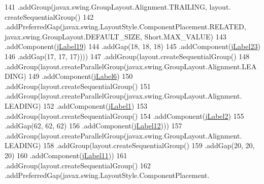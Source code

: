 \begin{DoxyCode}
141                                 .addGroup(javax.swing.GroupLayout.Alignment.TRAILING, layout.
      createSequentialGroup()
142                                     .addPreferredGap(javax.swing.LayoutStyle.ComponentPlacement.RELATED, 
      javax.swing.GroupLayout.DEFAULT\_SIZE, Short.MAX\_VALUE)
143                                     .addComponent(\mbox{\hyperlink{class_interfaz_package_1_1_interfaz_consulta_factura_a901a8d0df72dbe316e6945341e438f52}{jLabel19}})
144                                     .addGap(18, 18, 18)
145                                     .addComponent(\mbox{\hyperlink{class_interfaz_package_1_1_interfaz_consulta_factura_a1f75868545728f2ec9d78490ebcb8d39}{jLabel23}})
146                                     .addGap(17, 17, 17))))
147                         .addGroup(layout.createSequentialGroup()
148                             .addGroup(layout.createParallelGroup(javax.swing.GroupLayout.Alignment.LEADING)
149                                 .addComponent(\mbox{\hyperlink{class_interfaz_package_1_1_interfaz_consulta_factura_a0769a03c29fa86b156dbb861f170e3cf}{jLabel6}})
150                                 .addGroup(layout.createSequentialGroup()
151                                     .addGroup(layout.createParallelGroup(javax.swing.GroupLayout.Alignment.
      LEADING)
152                                         .addComponent(\mbox{\hyperlink{class_interfaz_package_1_1_interfaz_consulta_factura_aa4f98cc39ae51135b1d8e0e06f11af83}{jLabel1}})
153                                         .addGroup(layout.createSequentialGroup()
154                                             .addComponent(\mbox{\hyperlink{class_interfaz_package_1_1_interfaz_consulta_factura_a38f87d430d09d898be8970e195019a3a}{jLabel2}})
155                                             .addGap(62, 62, 62)
156                                             .addComponent(\mbox{\hyperlink{class_interfaz_package_1_1_interfaz_consulta_factura_ae159c41381ffd7d9927b558e61a5deb5}{jLabel12}})))
157                                     .addGroup(layout.createParallelGroup(javax.swing.GroupLayout.Alignment.
      LEADING)
158                                         .addGroup(layout.createSequentialGroup()
159                                             .addGap(20, 20, 20)
160                                             .addComponent(\mbox{\hyperlink{class_interfaz_package_1_1_interfaz_consulta_factura_a1919b598f93c83b94462145aac6a0bad}{jLabel11}}))
161                                         .addGroup(layout.createSequentialGroup()
162                                             .addPreferredGap(javax.swing.LayoutStyle.ComponentPlacement.

\end{DoxyCode}
